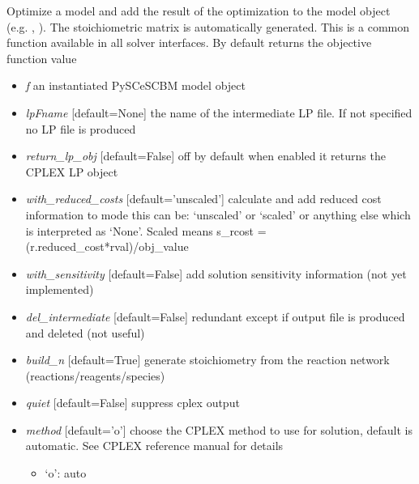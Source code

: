 \documentclass[a4paper,11pt,english]{sphinxmanual}
\begin{document}
\begin{fulllineitems}
\label{modules_doc:cbmpy.CBCPLEX.cplx_analyzeModel}
Optimize a model and add the result of the optimization to the model object
(e.g. , ). The stoichiometric
matrix is automatically generated. This is a common function available
in all solver interfaces. By default returns the objective function value
\begin{itemize}
\item {} 
\emph{f} an instantiated PySCeSCBM model object

\item {} 
\emph{lpFname} {[}default=None{]} the name of the intermediate LP file. If not specified no LP file is produced

\item {} 
\emph{return\_lp\_obj} {[}default=False{]} off by default when enabled it returns the CPLEX LP object

\item {} 
\emph{with\_reduced\_costs} {[}default='unscaled'{]} calculate and add reduced cost information to mode this can be: `unscaled' or `scaled'
or anything else which is interpreted as `None'. Scaled means s\_rcost = (r.reduced\_cost*rval)/obj\_value

\item {} 
\emph{with\_sensitivity} {[}default=False{]} add solution sensitivity information (not yet implemented)

\item {} 
\emph{del\_intermediate} {[}default=False{]} redundant except if output file is produced and deleted (not useful)

\item {} 
\emph{build\_n} {[}default=True{]} generate stoichiometry from the reaction network (reactions/reagents/species)

\item {} 
\emph{quiet} {[}default=False{]} suppress cplex output

\item {} 
\emph{method} {[}default='o'{]} choose the CPLEX method to use for solution, default is automatic. See CPLEX reference manual for details
\begin{itemize}
\item {} 
`o': auto


\end{itemize}
\end{itemize}
\end{fulllineitems}
\end{document}
